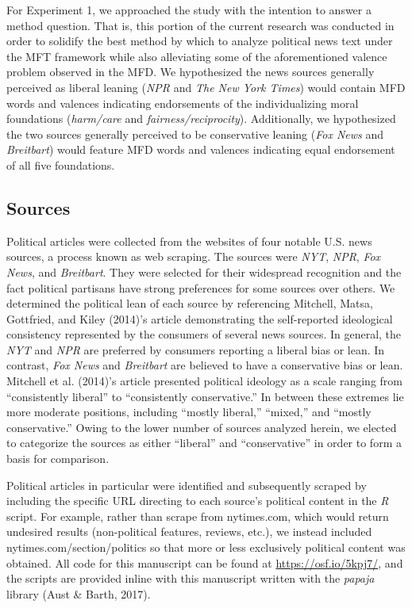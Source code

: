 \documentclass[
  english,
  man,floatsintext]{apa6}
\begin{document}
For Experiment 1, we approached the study with the intention to answer a method question. That is, this portion of the current research was conducted in order to solidify the best method by which to analyze political news text under the MFT framework while also alleviating some of the aforementioned valence problem observed in the MFD. We hypothesized the news sources generally perceived as liberal leaning (\emph{NPR} and \emph{The New York Times}) would contain MFD words and valences indicating endorsements of the individualizing moral foundations (\emph{harm/care} and \emph{fairness/reciprocity}). Additionally, we hypothesized the two sources generally perceived to be conservative leaning (\emph{Fox News} and \emph{Breitbart}) would feature MFD words and valences indicating equal endorsement of all five foundations.

\hypertarget{sources}{%
\subsection{Sources}\label{sources}}

Political articles were collected from the websites of four notable U.S. news sources, a process known as web scraping. The sources were \emph{NYT}, \emph{NPR}, \emph{Fox News}, and \emph{Breitbart}. They were selected for their widespread recognition and the fact political partisans have strong preferences for some sources over others. We determined the political lean of each source by referencing Mitchell, Matsa, Gottfried, and Kiley (2014)'s article demonstrating the self-reported ideological consistency represented by the consumers of several news sources. In general, the \emph{NYT} and \emph{NPR} are preferred by consumers reporting a liberal bias or lean. In contrast, \emph{Fox News} and \emph{Breitbart} are believed to have a conservative bias or lean. Mitchell et al. (2014)'s article presented political ideology as a scale ranging from ``consistently liberal'' to ``consistently conservative.'' In between these extremes lie more moderate positions, including ``mostly liberal,'' ``mixed,'' and ``mostly conservative.'' Owing to the lower number of sources analyzed herein, we elected to categorize the sources as either ``liberal'' and ``conservative'' in order to form a basis for comparison.

Political articles in particular were identified and subsequently scraped by including the specific URL directing to each source's political content in the \emph{R} script. For example, rather than scrape from nytimes.com, which would return undesired results (non-political features, reviews, etc.), we instead included nytimes.com/section/politics so that more or less exclusively political content was obtained. All code for this manuscript can be found at \url{https://osf.io/5kpj7/}, and the scripts are provided inline with this manuscript written with the \emph{papaja} library (Aust \& Barth, 2017).
\end{document}
